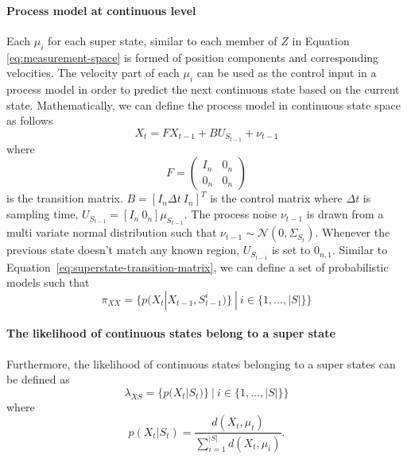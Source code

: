 \documentclass{article}
\begin{document}
\begin{multicols}{2}
    \paragraph{Process model at continuous level} Each $\mu_i$ for each super state, similar to each member of $Z$ in Equation \ref{eq:measurement-space} is formed of position components and corresponding velocities. The velocity part of each $\mu_i$ can be used as the control input in a process model in order to predict the next continuous state based on the current state. Mathematically, we can define the process model in continuous state space as follows 
        \begin{equation}
            X_{t} = FX_{t-1}+BU_{S_{t-1}}+\nu_{t-1}
            \label{eq:process-model}
        \end{equation}
        where 
        \begin{equation}
            F = 
            \begin{pmatrix}
            I_n & 0_n \\
            0_n & 0_n 
            \end{pmatrix}
        \end{equation}
        is the transition matrix. $B = [I_n \Delta t \ I_n]^T $ is the control matrix where $\Delta t$ is sampling time, $U_{S_{t-1}}=[I_n \ 0_n]\mu_{S_{t-1}}$. The process noise $\nu_{t-1}$ is drawn from a multi variate normal distribution such that $\nu_{t-1} \sim \mathcal{N}(0,\Sigma_{S_t})$. Whenever the previous state doesn't match any known region, $U_{S_{t-1}}$ is set to $0_{n,1}$. Similar to Equation~\ref{eq:superstate-transition-matrix}, we can define a set of probabilistic models such that
        \begin{equation}
            \pi_{XX} = \{p(X_t|X_{t-1},S^i_{t-1})\} \ | \ i \in \{1,\dots,|S|\} \}
            \label{eq:process-model}
        \end{equation}
        
        \paragraph{The likelihood of continuous states belong to a super state} Furthermore, the likelihood of continuous states belonging to a super states can be defined as 
        \begin{equation}
            \lambda_{XS}=\{p(X_t|S_{t})\} \ | \ i \in \{1,\dots,|S|\}\}
        \end{equation}  
        where 
        \begin{equation}
            p(X_t|S_{t}) = \frac{d(X_t,\mu_t)}{\sum_{i=1}^{|S|}d(X_t,\mu_i)}.
        \end{equation}  
    

\end{multicols}
\end{document}
